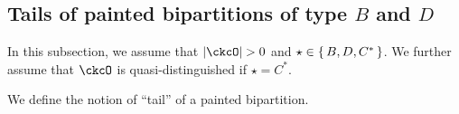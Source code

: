 \documentclass[12pt,a4paper]{amsart}
\def\abs#1{\left|{#1}\right|}
\def\PPm{\wp_{\downarrow}}
\def\uptaum{\uptau_{\downarrow}}
\numberwithin{equation}{section}
\newtheorem{lem}[thm]{Lemma}
\theoremstyle{remark}
\def\CPPs{\mathrm{PP}_{\star}}
\def\PBP{\mathsf{PBP}}
\begin{document}




\subsection{Tails of painted bipartitions of type $B$ and $D$}
\label{sec:tail}
In this subsection, we assume that $\abs{\ckcO}>0$ and
$\star\in\set{B, D, C^*}$. We further assume that $\ckcO$ is quasi-distinguished
if $\star = C^{*}$.

We define the notion of ``tail'' of a painted bipartition.
\end{document}
